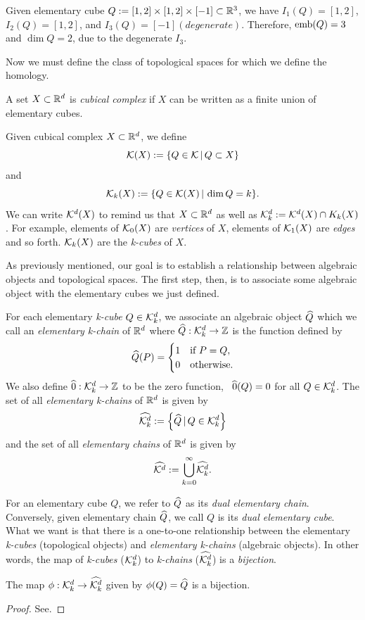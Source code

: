 \begin{exmp} \label{ex:embvsdim}
	Given elementary cube $Q := [1,2] \times [1,2] \times [-1] \subset \mathbb{R}^3$, we have $I_1(Q) = [1,2]$, $I_2(Q) = [1,2]$, and $I_3(Q) = [-1] (degenerate)$. Therefore, $\mathord{\mathrm{emb}(Q)} = 3$ and $\dim{Q} = 2$, due to the degenerate $I_3$.
\end{exmp}

Now we must define the class of topological spaces for which we define the homology.

\begin{defn}
	A set $X \subset \mathbb{R}^d$ is \textit{cubical complex} if $X$ can be written as a finite union of elementary cubes.
\end{defn}

Given cubical complex $X \subset \mathbb{R}^d$, we define
	$$ \mathcal{K}(X) := \{ Q \in \mathcal{K} \, | \, Q \subset X \} $$ and
	$$ \mathcal{K}_k (X) := \{ Q \in \mathcal{K} (X) \, | \, \dim{Q} = k \}. $$
We can write $\mathcal{K}^{d} (X)$ to remind us that $X \subset \mathbb{R}^d$ as well as $\mathcal{K}^{d}_k := \mathcal{K}^{d}(X) \cap K_k(X)$. For example, elements of $\mathcal{K}_0(X)$ are \textit{vertices} of $X$, elements of $\mathcal{K}_1(X)$ are \textit{edges} and so forth. $\mathcal{K}_k(X)$ are the \textit{k-cubes} of $X$.

As previously mentioned, our goal is to establish a relationship between algebraic objects and topological spaces. The first step, then, is to associate some algebraic object with the elementary cubes we just defined.
%
\begin{defn}
	For each elementary \textit{k-cube} $Q \in \mathcal{K}^{d}_k$, we associate an algebraic object $\widehat{Q}$ which we call an \textit{elementary k-chain} of $\mathbb{R}^d$ where $\widehat{Q} : \mathcal{K}^{d}_k \rightarrow \mathbb{Z}$ is the function defined by
	$$\widehat{Q}(P) =
		\begin{cases}
			1	& \text{if } P = Q, \\
			0	& \text{otherwise.}
		\end{cases}$$
	We also define $\widehat{0} : \mathcal{K}^{d}_k \rightarrow \mathbb{Z}$ to be the zero function, \ie~$\widehat{0}(Q) = 0$ for all $Q \in \mathcal{K}^{d}_k$.
	The set of all \textit{elementary k-chains} of $\mathbb{R}^d$ is given by
	$$ \widehat{\mathcal{K}^{d}_k} := \left\{ \widehat{Q} \, | \, Q \in \mathcal{K}^{d}_k \right\} $$ and the set of all \textit{elementary chains} of $\mathbb{R}^d$ is given by
	$$ \widehat{\mathcal{K}^{d}} := { \bigcup_{k=0}^{\infty} } \widehat{\mathcal{K}^{d}_k} . $$
\end{defn}

For an elementary cube $Q$, we refer to $\widehat{Q}$ as its \textit{dual elementary chain}. Conversely, given elementary chain $\widehat{Q}$, we call $Q$ is its \textit{dual elementary cube}. What we want is that there is a one-to-one relationship between the elementary \textit{k-cubes} (topological objects) and \textit{elementary k-chains} (algebraic objects). In other words, the map of \textit{k-cubes} ($\mathcal{K}^{d}_k$) to \textit{k-chains} ($\widehat{\mathcal{K}^{d}_k}$) is a \textit{bijection}. 
%
\begin{prop} \label{prop:bijection}
	The map $\phi : \mathcal{K}^{d}_k \rightarrow \widehat{\mathcal{K}^{d}_k}$ given by $\phi(Q) = \widehat{Q}$ is a bijection.
\end{prop}
%
\begin{proof}
	See.
\end{proof}

